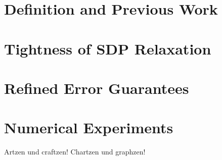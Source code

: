 \label{ch:ang_sync}
\section{Definition and Previous Work}


\section{Tightness of SDP Relaxation}
\label{sec:ang_sync_sdp}


\section{Refined Error Guarantees}
\label{sec:ang_sync_improve}


\section{Numerical Experiments}
\label{sec:ang_sync_num}
Artzen und craftzen!  Chartzen und graphzen!
